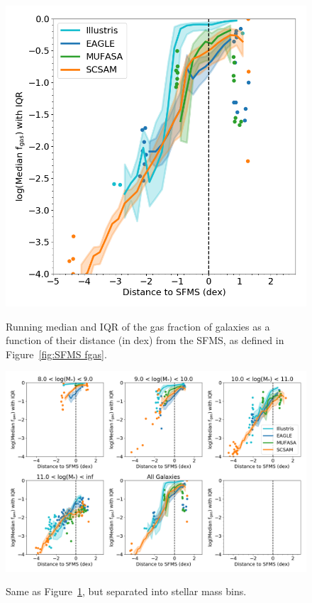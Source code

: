 \documentclass[fleqn,usenatbib]{mnras}
\begin{document}
\begin{figure}
\includegraphics[width = 0.99\linewidth]{fgas_DSFMS_binned_IQR_logged.png}\\
\caption{Running median and IQR of the gas fraction of galaxies as a function of their distance (in dex) from the SFMS, as defined in Figure~\ref{fig:SFMS fgas}.}
\label{fig:fgas DSFMS}
\end{figure}

\begin{figure}
\includegraphics[width = 0.99\linewidth]{fgas_DSFMS_panel_plot_IQR_logged.png}\\
\caption{Same as Figure~\ref{fig:fgas DSFMS}, but separated into stellar mass bins.}
\label{fig:fgas DSFMS panel}
\end{figure}
\end{document}
